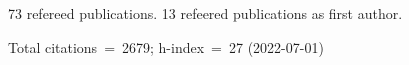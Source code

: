 73 refereed publications. 13 refeered publications as first author.

Total citations~=~2679; h-index~=~27 (2022-07-01)